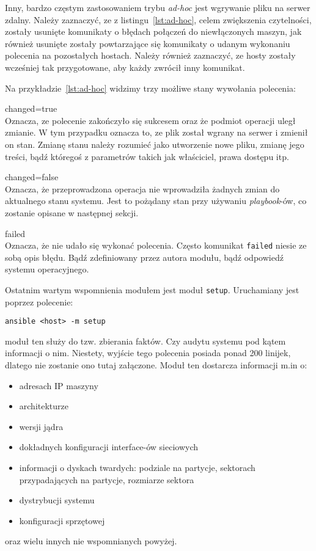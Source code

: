 Inny, bardzo częstym zastosowaniem trybu \textit{ad-hoc} jest wgrywanie pliku na serwer zdalny.
Należy zaznaczyć, ze z listingu~\ref{lst:ad-hoc}, celem zwiększenia czytelności, zostały usunięte komunikaty o błędach połączeń do niewłączonych maszyn, jak również usunięte zostały powtarzające się komunikaty o udanym wykonaniu polecenia na pozostałych hostach.
Należy również zaznaczyć, ze hosty zostały wcześniej tak przygotowane, aby każdy zwrócił inny komunikat.

Na przykładzie~\ref{lst:ad-hoc} widzimy trzy możliwe stany wywołania polecenia:
\begin{description}
	\item{changed=true}\\
		Oznacza, ze polecenie zakończyło się sukcesem oraz że podmiot operacji uległ zmianie. W tym przypadku oznacza to, ze plik został wgrany na serwer i zmienił on stan.
		Zmianę stanu należy rozumieć jako utworzenie nowe pliku, zmianę jego treści, bądź któregoś z parametrów takich jak właściciel, prawa dostępu itp.
	\item{changed=false}\\
		Oznacza, że przeprowadzona operacja nie wprowadziła żadnych zmian do aktualnego stanu systemu.
		Jest to pożądany stan przy używaniu \textit{playbook}-ów, co zostanie opisane w następnej sekcji.
	\item{failed}\\
		Oznacza, że nie udało się wykonać polecenia.
		Często komunikat \texttt{failed} niesie ze sobą opis błędu. Bądź zdefiniowany przez autora modułu, bądź odpowiedź systemu operacyjnego.
\end{description}
Ostatnim wartym wspomnienia modułem jest moduł \texttt{setup}. Uruchamiany jest poprzez polecenie:
\begin{lstlisting}
ansible <host> -m setup
\end{lstlisting}
moduł ten służy do tzw. zbierania faktów.
Czy audytu systemu pod kątem informacji o nim.
Niestety, wyjście tego polecenia posiada ponad 200 linijek, dlatego nie zostanie ono tutaj załączone.
Moduł ten dostarcza informacji m.in o:
\begin{itemize}
	\item adresach IP maszyny
	\item architekturze
	\item wersji jądra
	\item dokładnych konfiguracji interface-ów sieciowych
	\item informacji o dyskach twardych: podziale na partycje, sektorach przypadających na partycje, rozmiarze sektora
	\item dystrybucji systemu
	\item konfiguracji sprzętowej
\end{itemize}
oraz wielu innych nie wspomnianych powyżej.
